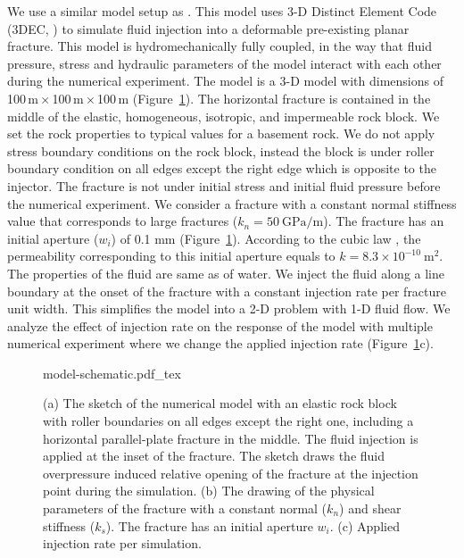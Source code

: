 \documentclass[draft]{agujournal2019}
\begin{document}
We use a similar model setup as . This model uses 3-D Distinct Element Code (3DEC, ) to simulate fluid injection into a deformable pre-existing planar fracture. This model is hydromechanically fully coupled, in the way that fluid pressure, stress and hydraulic parameters of the model interact with each other during the numerical experiment.  The model is a 3-D model with dimensions of 100\,m\,×\,100\,m\,×\,100\,m (Figure~\ref{fig:model-schematic}). The horizontal fracture is contained in the middle of the elastic, homogeneous, isotropic, and impermeable rock block. We set the rock properties to typical values for a basement rock. We do not apply stress boundary conditions on the rock block, instead the block is under roller boundary condition on all edges except the right edge which is opposite to the injector. The fracture is not under initial stress and initial fluid pressure before the numerical experiment. We consider a fracture with a constant normal stiffness value that corresponds to large fractures ($k_{n}=50~\mathrm{GPa/m}$). The fracture has an initial aperture ($w_{i}$) of 0.1 mm (Figure~\ref{fig:model-schematic}). According to the cubic law \cite{WitherspoonEtAl1980}, the permeability corresponding to this initial aperture equals to $k=8.3 \times  10^{-10}~\mathrm{m^2}$. The properties of the fluid are same as of water. We inject the fluid along a line boundary at the onset of the fracture with a constant injection rate per fracture unit width. This simplifies the model into a 2-D problem with 1-D fluid flow. We analyze the effect of injection rate on the response of the model with multiple numerical experiment where we change the applied injection rate (Figure~\ref{fig:model-schematic}c).

\begin{figure}[htb!]
	\centering
	{model-schematic.pdf_tex}
	\caption{(a) The sketch of the numerical model with an elastic rock block with roller boundaries on all edges except the right one, including a horizontal parallel-plate fracture in the middle. The fluid injection is applied at the inset of the fracture. The sketch draws the fluid overpressure induced relative opening of the fracture at the injection point during the simulation. (b) The drawing of the physical parameters of the fracture with a constant normal ($k_{n}$) and shear stiffness ($k_{s}$). The fracture has an initial aperture $w_{i}$. (c) Applied injection rate per simulation.}
	\label{fig:model-schematic}
\end{figure}
\end{document}
